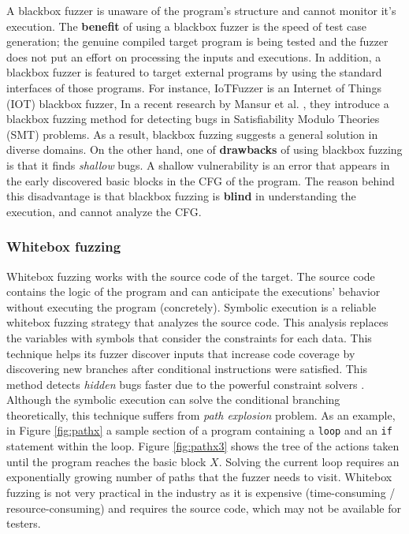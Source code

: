 A blackbox fuzzer is unaware of the program's structure and cannot monitor it's execution. The \textbf{benefit} of using a blackbox fuzzer is the speed of test case generation; the genuine compiled target program is being tested and the fuzzer does not put an effort on processing the inputs and executions. In addition, a blackbox fuzzer is featured to target external programs by using the standard interfaces of those programs. For instance, IoTFuzzer \cite{chen2018iotfuzzer} is an Internet of Things (IOT) blackbox fuzzer,  
In a recent research by Mansur et al. \cite{mansur2020detecting}, they introduce a blackbox fuzzing method for detecting bugs in Satisfiability Modulo Theories (SMT) problems. As a result, blackbox fuzzing suggests a general solution in diverse domains. On the other hand, one of \textbf{drawbacks} of using blackbox fuzzing is that it finds \textit{shallow} bugs. A shallow vulnerability is an error that appears in the early discovered basic blocks in the CFG of the program. The reason behind this disadvantage is that blackbox fuzzing is \textbf{blind} in understanding the execution, and cannot analyze the CFG.


\subsubsection{Whitebox fuzzing}

Whitebox fuzzing works with the source code of the target. The source code contains the logic of the program and can anticipate the executions' behavior without executing the program (concretely). Symbolic execution \cite{king1976symbolic} is a reliable whitebox fuzzing strategy that analyzes the source code. This analysis replaces the variables with symbols that consider the constraints for each data. This technique helps its fuzzer discover inputs that increase code coverage by discovering new branches after conditional instructions were satisfied. This method detects \textit{hidden} bugs faster due to the powerful constraint solvers \cite{godefroid2008automated}. Although the symbolic execution can solve the conditional branching theoretically, this technique suffers from \textit{path explosion} problem. As an example, in Figure \ref{fig:pathx} a sample section of a program containing a \texttt{loop} and an \texttt{if} statement within the loop. Figure \ref{fig:pathx3} shows the tree of the actions taken until the program reaches the basic block $X$. Solving the current loop requires an exponentially growing number of paths that the fuzzer needs to visit. Whitebox fuzzing is not very practical in the industry as it is expensive (time-consuming / resource-consuming) and requires the source code, which may not be available for testers.

